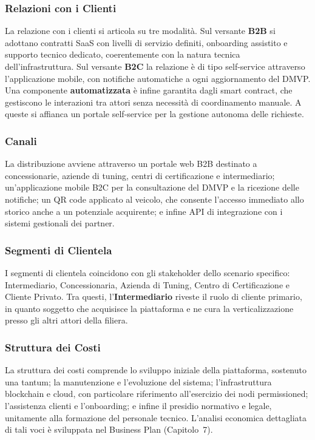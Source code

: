 \subsubsection*{Relazioni con i Clienti}

La relazione con i clienti si articola su tre modalità. Sul versante \textbf{B2B} si adottano contratti SaaS con livelli di servizio definiti, onboarding assistito e supporto tecnico dedicato, coerentemente con la natura tecnica dell'infrastruttura. Sul versante \textbf{B2C} la relazione è di tipo self-service attraverso l'applicazione mobile, con notifiche automatiche a ogni aggiornamento del DMVP. Una componente \textbf{automatizzata} è infine garantita dagli smart contract, che gestiscono le interazioni tra attori senza necessità di coordinamento manuale. A queste si affianca un portale self-service per la gestione autonoma delle richieste.

\subsubsection*{Canali}

La distribuzione avviene attraverso un portale web B2B destinato a concessionarie, aziende di tuning, centri di certificazione e intermediario; un'applicazione mobile B2C per la consultazione del DMVP e la ricezione delle notifiche; un QR code applicato al veicolo, che consente l'accesso immediato allo storico anche a un potenziale acquirente; e infine API di integrazione con i sistemi gestionali dei partner.

\subsubsection*{Segmenti di Clientela}

I segmenti di clientela coincidono con gli stakeholder dello scenario specifico: Intermediario, Concessionaria, Azienda di Tuning, Centro di Certificazione e Cliente Privato. Tra questi, l'\textbf{Intermediario} riveste il ruolo di cliente primario, in quanto soggetto che acquisisce la piattaforma e ne cura la verticalizzazione presso gli altri attori della filiera.

\subsubsection*{Struttura dei Costi}

La struttura dei costi comprende lo sviluppo iniziale della piattaforma, sostenuto una tantum; la manutenzione e l'evoluzione del sistema; l'infrastruttura blockchain e cloud, con particolare riferimento all'esercizio dei nodi permissioned; l'assistenza clienti e l'onboarding; e infine il presidio normativo e legale, unitamente alla formazione del personale tecnico. L'analisi economica dettagliata di tali voci è sviluppata nel Business Plan (Capitolo~7).

